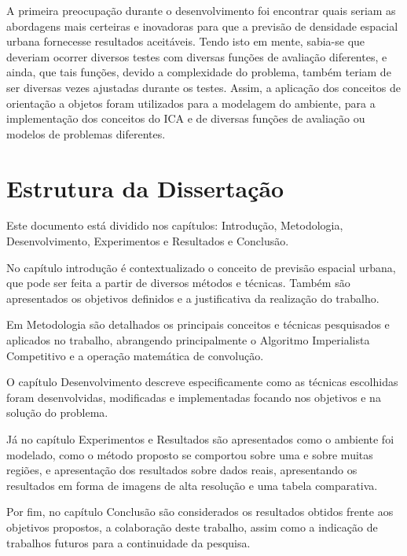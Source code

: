 A primeira preocupação durante o desenvolvimento foi encontrar quais seriam as abordagens mais certeiras e inovadoras para que a previsão de densidade espacial urbana fornecesse resultados aceitáveis. Tendo isto em mente, sabia-se que deveriam ocorrer diversos testes com diversas funções de avaliação diferentes, e ainda, que tais funções, devido a complexidade do problema, também teriam de ser diversas vezes ajustadas durante os testes. Assim, a aplicação dos conceitos de orientação a objetos foram utilizados para a modelagem do ambiente, para a implementação dos conceitos do ICA e de diversas funções de avaliação ou modelos de problemas diferentes.





\section{Estrutura da Dissertação}


Este documento está dividido nos capítulos: Introdução, Metodologia, Desenvolvimento, Experimentos e Resultados e Conclusão.

No capítulo introdução é contextualizado o conceito de previsão espacial urbana, que pode ser feita a partir de diversos métodos e técnicas. Também são apresentados os objetivos definidos e a justificativa da realização do trabalho.

Em Metodologia são detalhados os principais conceitos e técnicas pesquisados e aplicados no trabalho, abrangendo principalmente o Algoritmo Imperialista Competitivo e a operação matemática de convolução.

O capítulo Desenvolvimento descreve especificamente como as técnicas escolhidas foram desenvolvidas, modificadas e implementadas focando nos objetivos e na solução do problema.

Já no capítulo Experimentos e Resultados são apresentados como o ambiente foi modelado, como o método proposto se comportou sobre uma e sobre muitas regiões, e apresentação dos resultados sobre dados reais, apresentando os resultados em forma de imagens de alta resolução e uma tabela comparativa.

Por fim, no capítulo Conclusão são considerados os resultados obtidos frente aos objetivos propostos, a colaboração deste trabalho, assim como a indicação de trabalhos futuros para a continuidade da pesquisa.



